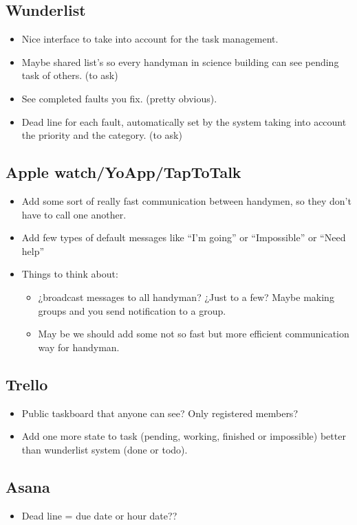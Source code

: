 \documentclass{article}
\begin{document}
\subsection{Wunderlist}

\begin{itemize}
\item Nice interface to take into account for the task management.
\item Maybe shared list's so every handyman in science building can see pending task of others. (to ask)
\item See completed faults you fix. (pretty obvious).
\item Dead line for each fault, automatically set by the system taking into account the priority and the category. (to ask) 
\end{itemize}


\subsection{Apple watch/YoApp/TapToTalk} 

\begin{itemize}
\item Add some sort of really fast communication between handymen, so they don't have to call one another.
\item Add few types of default messages like “I'm going” or “Impossible” or “Need help”
\item Things to think about:
\begin{itemize}\label{AppleWatch}
\item ¿broadcast messages to all handyman? ¿Just to a few? Maybe making groups and you send notification to a group.
\item May be we should add some not so fast but more efficient communication way for handyman.
\end{itemize}
\end{itemize}

\subsection{Trello}

\begin{itemize}
\item Public taskboard that anyone can see? Only registered members?
\item Add one more state to task (pending, working, finished or impossible) better than wunderlist system (done or todo).
\end{itemize}

\subsection{Asana}
\begin{itemize}
 	\item  Dead line = due date or hour date??
\end{itemize}
\end{document}

